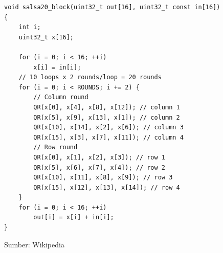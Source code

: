 \documentclass{article}
\begin{document}

\begin{verbatim}
void salsa20_block(uint32_t out[16], uint32_t const in[16])
{
    int i;
    uint32_t x[16];

    for (i = 0; i < 16; ++i)
        x[i] = in[i];
    // 10 loops x 2 rounds/loop = 20 rounds
    for (i = 0; i < ROUNDS; i += 2) {
        // Column round
        QR(x[0], x[4], x[8], x[12]); // column 1
        QR(x[5], x[9], x[13], x[1]); // column 2
        QR(x[10], x[14], x[2], x[6]); // column 3
        QR(x[15], x[3], x[7], x[11]); // column 4
        // Row round
        QR(x[0], x[1], x[2], x[3]); // row 1
        QR(x[5], x[6], x[7], x[4]); // row 2
        QR(x[10], x[11], x[8], x[9]); // row 3
        QR(x[15], x[12], x[13], x[14]); // row 4
    }
    for (i = 0; i < 16; ++i)
        out[i] = x[i] + in[i];
}
\end{verbatim}

\begin{flushright}
Sumber: Wikipedia
\end{flushright}
\end{document}
